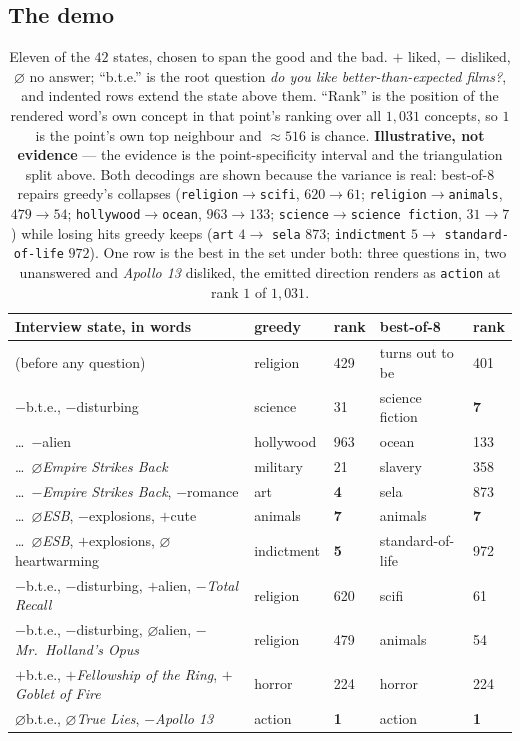 \documentclass[11pt]{article}
\begin{document}
\subsection{The demo}

\begin{table}[h]
\centering\footnotesize
\begin{tabular}{@{}p{}llll@{}}
\toprule
\textbf{Interview state, in words} & \textbf{greedy} & \textbf{rank} & \textbf{best-of-8} &
\textbf{rank} \\
\midrule
(before any question) & religion & 429 & turns out to be & 401 \\
$-$b.t.e., $-$disturbing & science & 31 & science fiction & \textbf{7} \\
\quad\dots\ $-$alien & hollywood & 963 & ocean & 133 \\
\quad\dots\ $\varnothing$\emph{Empire Strikes Back} & military & 21 & slavery & 358 \\
\quad\dots\ $-$\emph{Empire Strikes Back}, $-$romance & art & \textbf{4} & sela & 873 \\
\quad\dots\ $\varnothing$\emph{ESB}, $-$explosions, $+$cute & animals & \textbf{7} & animals &
\textbf{7} \\
\quad\dots\ $\varnothing$\emph{ESB}, $+$explosions, $\varnothing$heartwarming & indictment &
\textbf{5} & standard-of-life & 972 \\
$-$b.t.e., $-$disturbing, $+$alien, $-$\emph{Total Recall} & religion & 620 & scifi & 61 \\
$-$b.t.e., $-$disturbing, $\varnothing$alien, $-$\emph{Mr.~Holland's Opus} & religion & 479 &
animals & 54 \\
$+$b.t.e., $+$\emph{Fellowship of the Ring}, $+$\emph{Goblet of Fire} & horror & 224 & horror &
224 \\
$\varnothing$b.t.e., $\varnothing$\emph{True Lies}, $-$\emph{Apollo 13} & action & \textbf{1} &
action & \textbf{1} \\
\bottomrule
\end{tabular}
\caption{Eleven of the $42$ states, chosen to span the good and the bad. $+$ liked, $-$ disliked,
$\varnothing$ no answer; ``b.t.e.'' is the root question \emph{do you like better-than-expected
films?}, and indented rows extend the state above them. ``Rank'' is the position of the rendered
word's own concept in that point's ranking over all $1{,}031$ concepts, so $1$ is the point's own top
neighbour and $\approx516$ is chance. \textbf{Illustrative, not evidence} --- the evidence is the
point-specificity interval and the triangulation split above. Both decodings are shown because the
variance is real: best-of-8 repairs greedy's collapses
(\texttt{religion}$\to$\texttt{scifi}, $620\to61$; \texttt{religion}$\to$\texttt{animals},
$479\to54$; \texttt{hollywood}$\to$\texttt{ocean}, $963\to133$;
\texttt{science}$\to$\texttt{science fiction}, $31\to7$) while losing hits greedy keeps
(\texttt{art} $4 \to$ \texttt{sela} $873$; \texttt{indictment} $5 \to$
\texttt{standard-of-life} $972$). One row is the best in the set under both: three questions in, two
unanswered and \emph{Apollo 13} disliked, the emitted direction renders as \texttt{action} at rank
$1$ of $1{,}031$.}
\label{tab:demo}
\end{table}
\end{document}
